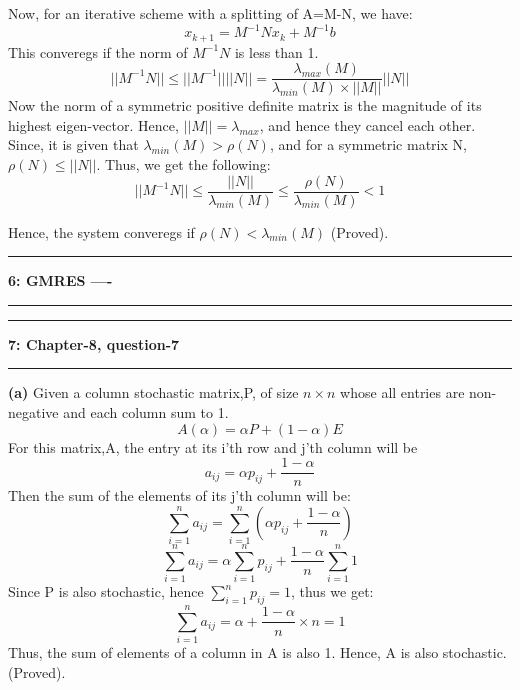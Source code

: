 \documentclass{article}
\newcommand\question[2]{\vspace{.25in}\hrule\textbf{#1: #2}\hrule\vspace{.10in}}
\renewcommand\part[1]{\vspace{.10in}\textbf{(#1)}}
\begin{document}
  Now, for an iterative scheme with a splitting of A=M-N, we have: \newline
  \[ x_{k+1} = M^{-1}Nx_k + M^{-1}b \]
  This converegs if the norm of $M^{-1}N$ is less than 1.\newline
  \[ ||M^{-1}N|| \leq ||M^{-1}|| ||N|| =  \dfrac{\lambda_{max}(M)}{\lambda_{min}(M) \times ||M||} ||N|| \]
  Now the norm of a symmetric positive definite matrix is the magnitude of its highest eigen-vector. Hence, $||M|| = \lambda_{max}$, and hence they cancel each other. Since, it is given that $\lambda_{min}(M) > \rho(N)$, and for a symmetric matrix N, $\rho(N) \leq ||N||$. Thus, we get the following: \newline
  \[||M^{-1}N|| \leq \dfrac{||N||}{\lambda_{min}(M)} \leq \dfrac{\rho(N)}{\lambda_{min}(M)} < 1 \]

  Hence, the system converegs if $\rho(N) < \lambda_{min}(M)$ (Proved). \newline



  \question{6}{GMRES ----}

  \question{7}{Chapter-8, question-7}
  \part{a} Given a column stochastic matrix,P, of size $n \times n$ whose all entries are non-negative and each column sum to 1. 
   \[A(\alpha) = \alpha P + (1-\alpha)E \]
   For this matrix,A, the entry at its i'th row and j'th column will be
   \[a_{ij} = \alpha p_{ij} + \dfrac{1-\alpha}{n}\]
   Then the sum of the elements of its j'th column will be:
   \[ \sum_{i=1}^n a_{ij} = \sum_{i=1}^n (\alpha p_{ij} + \dfrac{1-\alpha}{n}) \]
   \[ \sum_{i=1}^n a_{ij} = \alpha \sum_{i=1}^n p_{ij} + \dfrac{1-\alpha}{n}\sum_{i=1}^n 1 \]
   Since P is also stochastic, hence $\sum_{i=1}^n p_{ij} = 1$, thus we get: \newline
   \[ \sum_{i=1}^n a_{ij} = \alpha + \dfrac{1-\alpha}{n}\times n = 1 \]
   Thus, the sum of elements of a column in A is also 1. Hence, A is also stochastic. (Proved). \newline
\end{document}
